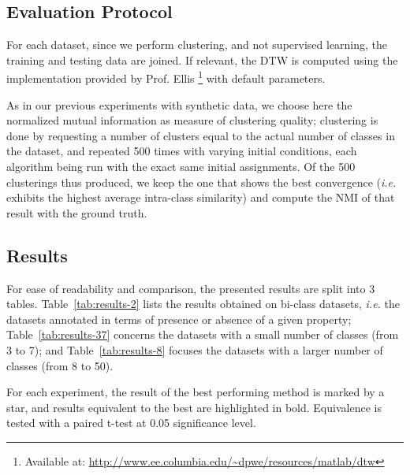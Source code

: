\documentclass[10pt,journal,compsoc]{IEEEtran}
\begin{document}
\subsection{Evaluation Protocol}

For each dataset, since we perform clustering, and not supervised learning, the training and testing data are joined. If relevant, the DTW is computed using the implementation provided by Prof. Ellis \footnote{Available at: \url{http://www.ee.columbia.edu/~dpwe/resources/matlab/dtw}} with default parameters.

As in our previous experiments with synthetic data, we choose here the normalized mutual information as measure of clustering quality; clustering is done by requesting a number of clusters equal to the actual number of classes in the dataset, and repeated 500 times with varying initial conditions, each algorithm being run with the exact same initial assignments. Of the 500 clusterings thus produced, we keep the one that shows the best convergence (\emph{i.e.} exhibits the highest average intra-class similarity) and compute the NMI of that result with the ground truth.

\subsection{Results}

For ease of readability and comparison, the presented results are split into 3 tables. Table~\ref{tab:results-2} lists the results obtained on bi-class datasets, \textit{i.e.} the datasets annotated in terms of presence or absence of a given property; Table~\ref{tab:results-37} concerns the datasets with a small number of classes (from 3 to 7); and Table~\ref{tab:results-8} focuses the datasets with a larger number of classes (from 8 to 50).

For each experiment, the result of the best performing method is marked by a star, and results equivalent to the best are highlighted in bold. Equivalence is tested with a paired t-test at 0.05 significance level.

\end{document}
